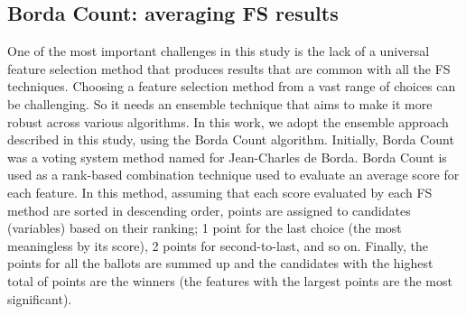 \subsection{Borda Count: averaging FS results}
One of the most important challenges in this study is the lack of a universal feature selection method that produces results that are common with all the FS techniques. Choosing a feature selection method from a vast range of choices can be challenging. \newline
So it needs an ensemble technique that aims to make it more robust across various algorithms. In this work, we adopt the ensemble approach described in this study\cite{sarkar2014robust}, using the Borda Count algorithm. Initially, Borda Count was a voting system method named for Jean-Charles de Borda\cite{borda1784memoire}.\newline
Borda Count is used as a rank-based combination technique used to evaluate an average score for each feature. In this method, assuming that each score evaluated by each FS method are sorted in descending order, points are assigned to candidates (variables) based on their ranking; 1 point for the last choice (the most meaningless by its score), 2 points for second-to-last, and so on. Finally, the points for all the ballots are summed up and the candidates with the highest total of points are the winners (the features with the largest points are the most significant).
\par


